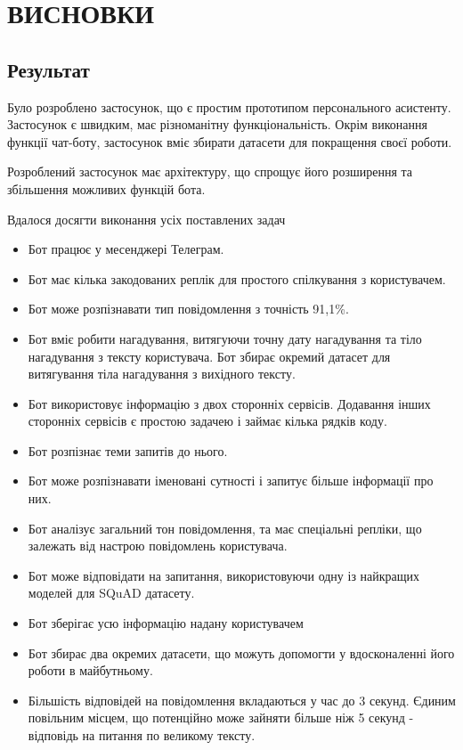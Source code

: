 \chapter*{ВИСНОВКИ}                       %
\section*{Результат}
Було розроблено застосунок, що є простим прототипом персонального асистенту. Застосунок є швидким, має різноманітну функціональність. Окрім виконання функції чат-боту, застосунок вміє збирати датасети для покращення своєї роботи. 

Розроблений застосунок має архітектуру, що спрощує його розширення та збільшення можливих функцій бота. 

Вдалося досягти виконання усіх поставлених задач
\begin{itemize}
\item Бот працює у месенджері Телеграм.
\item Бот має кілька закодованих реплік для простого спілкування з користувачем.
\item Бот може розпізнавати тип повідомлення з точність 91,1\%.
\item Бот вміє робити нагадування, витягуючи точну дату нагадування та тіло нагадування з тексту користувача. Бот збирає окремий датасет для витягування тіла нагадування з вихідного тексту.
\item Бот використовує інформацію з двох сторонніх сервісів. Додавання інших сторонніх сервісів є простою задачею і займає кілька рядків коду.
\item Бот розпізнає теми запитів до нього.
\item Бот може розпізнавати іменовані сутності і запитує більше інформації про них.
\item Бот аналізує загальний тон повідомлення, та має спеціальні репліки, що залежать від настрою повідомлень користувача.
\item Бот може відповідати на запитання, використовуючи одну із найкращих моделей для SQuAD датасету.
\item Бот зберігає усю інформацію надану користувачем
\item Бот збирає два окремих датасети, що можуть допомогти у вдосконаленні його роботи в майбутньому.
\item Більшість відповідей на повідомлення вкладаються у час до 3 секунд. Єдиним повільним місцем, що потенційно може зайняти більше ніж 5 секунд - відповідь на питання по великому тексту.
\end{itemize}

